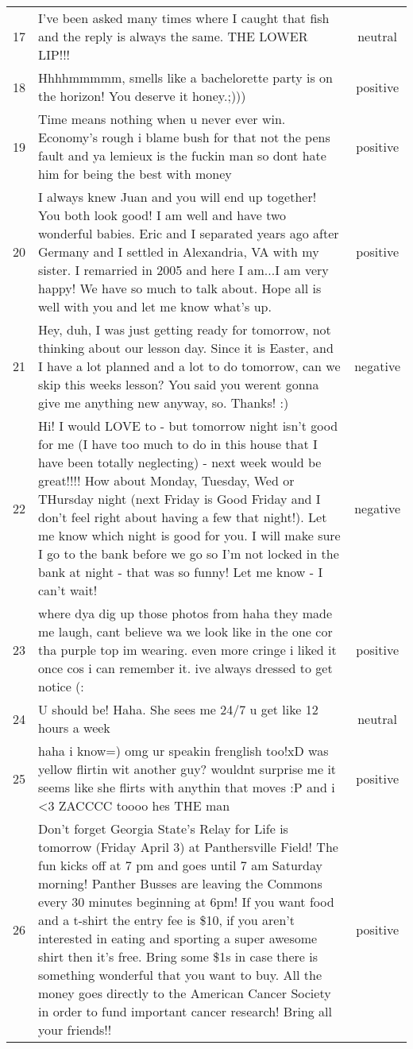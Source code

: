 \begin{center}
\begin{footnotesize}
\begin{longtable}{cp{3.8in}c}
17 & I've been asked many times where I caught that fish and the reply is always the same.  THE LOWER LIP!!! & neutral\\
18 & Hhhhmmmmm, smells like a bachelorette party is on the horizon! You deserve it honey.;))) & positive\\
19 & Time means nothing when u never ever win. Economy's rough i blame bush for that not the pens fault and ya lemieux is the fuckin man so dont hate him for being the best with money & positive\\
20 & I always knew Juan and you will end up together!  You both look good!  I am well and have two wonderful babies.  Eric and I separated years ago after Germany and I settled in Alexandria, VA with my sister.  I remarried in 2005 and here I am...I am very happy!  We have so much to talk about.  Hope all is well with you and let me know what's up. & positive\\
21 & Hey, duh, I was just getting ready for tomorrow, not thinking about our lesson day. Since it is Easter, and I have a lot planned and a lot to do tomorrow, can we skip this weeks lesson? You said you werent gonna give me anything new anyway, so. Thanks! :) & negative\\
22 & Hi!  I would LOVE to - but tomorrow night isn't good for me (I have too much to do in this house that I have been totally neglecting) - next week would be great!!!! How about Monday, Tuesday, Wed or THursday night (next Friday is Good Friday and I don't feel right about having a few that night!).  Let me know which night is good for you.  I will make sure I go to the bank before we go so I'm not locked in the bank at night - that was so funny!  Let me know - I can't wait! & negative\\
23 & where dya dig up those photos from haha they made me laugh,  cant believe wa we look like in the one cor tha purple top im wearing.  even more cringe i liked it once cos i can remember it. ive always dressed to get notice (:  & positive\\
24 & U should be!  Haha.  She sees me 24/7 u get like 12 hours a week & neutral\\
25 & haha i know=) omg ur speakin frenglish too!xD was yellow flirtin wit another guy? wouldnt surprise me it seems like she flirts with anythin that moves :P and  i <3 ZACCCC toooo hes THE man & positive\\
26 & Don’t forget Georgia State’s Relay for Life is tomorrow (Friday April 3) at Panthersville Field! The fun kicks off at 7 pm and goes until 7 am Saturday morning! Panther Busses are leaving the Commons every 30 minutes beginning at 6pm! If you want food and a t-shirt the entry fee is \$10, if you aren’t interested in eating and sporting a super awesome shirt then it’s free. Bring some \$1s in case there is something wonderful that you want to buy. All the money goes directly to the American Cancer Society in order to fund important cancer research! Bring all your friends!! & positive\\

\end{longtable}
\end{footnotesize}
\end{center}

